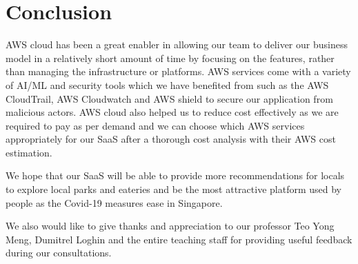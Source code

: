 \documentclass[12pt,a4paper]{article}
\begin{document}
\section{Conclusion}

AWS cloud has been a great enabler in allowing our team to deliver our business model in a relatively short amount of time by focusing on the features, rather than managing the infrastructure or platforms. AWS services come with a variety of AI/ML and security tools which we have benefited from such as the AWS CloudTrail, AWS Cloudwatch and AWS shield to secure our application from malicious actors. AWS cloud also helped us to reduce cost effectively as we are required to pay as per demand and we can choose which AWS services appropriately for our SaaS after a thorough cost analysis with their AWS cost estimation. 

We hope that our SaaS will be able to provide more recommendations for locals to explore local parks and eateries and be the most attractive platform used by people as the Covid-19 measures ease in Singapore. 

We also would like to give thanks and appreciation to our professor Teo Yong Meng, Dumitrel Loghin and the entire teaching staff for providing useful feedback during our consultations.
\end{document}
